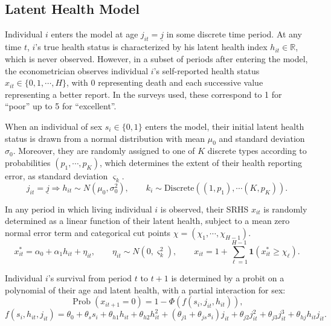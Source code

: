 \documentclass[12pt,pdftex,letterpaper]{article}
\newcommand{\Prob}{\operatorname{Prob}}
\newcommand{\R}{\mathbb{R}}
\newcommand{\Health}{h}
\newcommand{\TopHealth}{H}
\newcommand{\Report}{x}
\newcommand{\Age}{j}
\newcommand{\Sex}{s}
\newcommand{\AgeMin}{\underline{\Age}}
\newcommand{\HealthInitMean}{\mu_0}
\newcommand{\HealthInitStd}{\sigma_0}
\newcommand{\Cut}{\chi}
\newcommand{\MortParam}{\theta}
\newcommand{\LatentParam}{\alpha}
\newcommand{\ReportShock}{\eta}
\newcommand{\TypeProb}{p}
\newcommand{\ReportStd}{\varsigma}
\begin{document}
\subsection{Latent Health Model}\label{sec:Model}

Individual $i$ enters the model at age $\Age_{it}=\AgeMin$ in some discrete time period.  At any time $t$, $i$'s true health status is characterized by his latent health index  $\Health_{it} \in \R$, which is never observed.  However, in a subset of periods after entering the model, the econometrician observes individual $i$'s self-reported health status $\Report_{it} \in \{0,1,\cdots,\TopHealth\}$, with $0$ representing death and each successive value representing a better report.  In the surveys used, these correspond to 1 for ``poor'' up to 5 for ``excellent''.

When an individual of sex $\Sex_i \in \{0,1\}$ enters the model, their initial latent health status is drawn from a normal distribution with mean $\HealthInitMean$ and standard deviation $\HealthInitStd$. Moreover, they are randomly assigned to one of $K$ discrete types according to probabilities $(\TypeProb_1,\cdots,\TypeProb_K)$, which determines the extent of their health reporting error, as standard deviation $\ReportStd_k$.
\begin{equation}\label{HealthInit}
\Age_{it}=\AgeMin \Longrightarrow \Health_{it} \sim N(\HealthInitMean, \HealthInitStd^2), \qquad k_i \sim \text{Discrete}\left((1,\TypeProb_1),\cdots (K,\TypeProb_K) \right).
\end{equation}

In any period in which living individual $i$ is observed, their SRHS $\Report_{it}$ is randomly determined as a linear function of their latent health, subject to a mean zero normal error term and categorical cut points $\Cut = (\Cut_1, \cdots, \Cut_{\TopHealth-1})$.
\begin{equation}\label{Report}
\Report^*_{it} = \LatentParam_0 + \LatentParam_1 \Health_{it} + \ReportShock_{it}, \qquad \ReportShock_{it} \sim N(0,\ReportStd_k^2), \qquad \Report_{it} = 1 + \sum_{\ell = 1}^{\TopHealth-1} \mathbf{1}(\Report^*_{it} \geq \Cut_\ell). 
\end{equation}

Individual $i$'s survival from period $t$ to $t+1$ is determined by a probit on a polynomial of their age and latent health, with a partial interaction for sex:
\begin{equation}\label{Mortality}
\Prob(\Report_{it+1} = 0) = 1 - \Phi(f(\Sex_i,\Age_{it}, \Health_{it})),
\end{equation}
\begin{equation*}
f(\Sex_i,\Health_{it}, \Age_{it}) = \MortParam_0 + \MortParam_\Sex \Sex_i + \MortParam_{\Health1} \Health_{it} + \MortParam_{\Health2} \Health_{it}^2 + (\MortParam_{\Age1} + \MortParam_{\Age\Sex}\Sex_i) \Age_{it} + \MortParam_{\Age2} \Age_{it}^2 + \MortParam_{\Age3} \Age_{it}^3 + \MortParam_{\Health \Age} \Health_{it} \Age_{it}.
\end{equation*}
\end{document}
